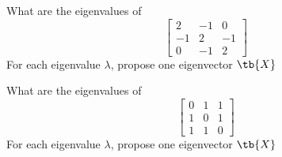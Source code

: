 \bexo
What are the eigenvalues of 
\begin{equation*}
\left[
\begin{array}{ccc}
2 & -1 &0\\
-1 & 2 &-1\\
0 & -1 &2
\end{array}
\right]
\end{equation*}
For each eigenvalue $\lambda$, propose one eigenvector $\tb{X}$
\eexo{}


\bexo
What are the eigenvalues of 
\begin{equation*}
\left[
\begin{array}{ccc}
0 & 1 & 1\\
1 & 0 & 1\\
1 & 1 & 0
\end{array}
\right]
\end{equation*}
For each eigenvalue $\lambda$, propose one eigenvector $\tb{X}$
\eexo{}

